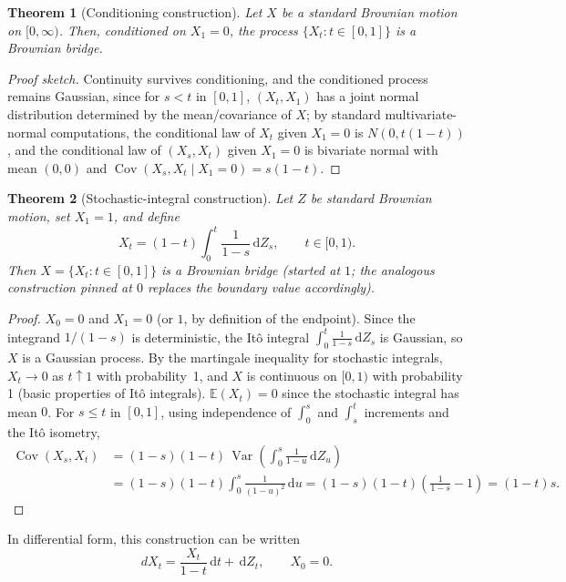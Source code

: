 \documentclass[12pt,openany]{book}
\newtheorem{theorem}{Theorem}[section]
\theoremstyle{definition}
\theoremstyle{remark}
\newcommand{\E}{\mathbb{E}}
\newcommand{\dd}{\,\mathrm{d}}
\DeclareMathOperator{\Var}{Var}
\DeclareMathOperator{\Cov}{Cov}
\begin{document}
\begin{theorem}[Conditioning construction]
Let $X$ be a standard Brownian motion on $[0,\infty)$. Then, conditioned on $X_1=0$, the process $\{X_t : t\in[0,1]\}$ is a Brownian bridge.
\end{theorem}
\begin{proof}[Proof sketch]
Continuity survives conditioning, and the conditioned process remains Gaussian, since for $s<t$ in $[0,1]$, $(X_t,X_1)$ has a joint normal distribution determined by the mean/covariance of $X$; by standard multivariate-normal computations, the conditional law of $X_t$ given $X_1=0$ is $N(0,t(1-t))$, and the conditional law of $(X_s,X_t)$ given $X_1=0$ is bivariate normal with mean $(0,0)$ and $\Cov(X_s,X_t \mid X_1=0) = s(1-t)$.
\end{proof}
 
\begin{theorem}[Stochastic-integral construction]
Let $Z$ be standard Brownian motion, set $X_1=1$, and define
\begin{equation}
    X_t = (1-t)\int_0^t \frac{1}{1-s}\dd Z_s, \qquad t\in[0,1). \tag{18.3.7}
\end{equation}
Then $X = \{X_t : t\in[0,1]\}$ is a Brownian bridge (started at $1$; the analogous construction pinned at $0$ replaces the boundary value accordingly).
\end{theorem}
\begin{proof}
$X_0=0$ and $X_1=0$ (or $1$, by definition of the endpoint). Since the integrand $1/(1-s)$ is deterministic, the It\^o integral $\int_0^t \frac{1}{1-s}\dd Z_s$ is Gaussian, so $X$ is a Gaussian process. By the martingale inequality for stochastic integrals, $X_t \to 0$ as $t\uparrow 1$ with probability~1, and $X$ is continuous on $[0,1)$ with probability 1 (basic properties of It\^o integrals). $\E(X_t)=0$ since the stochastic integral has mean $0$. For $s\le t$ in $[0,1]$, using independence of $\int_0^s$ and $\int_s^t$ increments and the It\^o isometry,
\begin{align}
    \Cov(X_s,X_t) &= (1-s)(1-t)\,\Var\!\left(\int_0^s \frac{1}{1-u}\dd Z_u\right) \tag{18.3.9} \\
    &= (1-s)(1-t)\int_0^s \frac{1}{(1-u)^2}\dd u = (1-s)(1-t)\left(\frac{1}{1-s}-1\right) = (1-t)s. \tag{18.3.10}
\end{align}
\end{proof}
 
In differential form, this construction can be written
\begin{equation}
    dX_t = \frac{X_t}{1-t}\dd t + \dd Z_t, \qquad X_0=0. \tag{18.3.11}
\end{equation}
 
\end{document}
